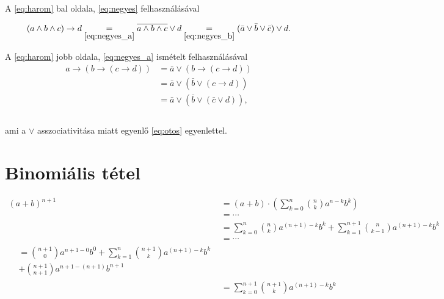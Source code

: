 \documentclass{article}
\begin{document}
A \eqref{eq:harom} bal oldala, \eqref{eq:negyes} felhasználásával

\begin{equation}
(a \wedge b \wedge c) \rightarrow d \underset{\eqref{eq:negyes_a}}{=} \overline{a \wedge b \wedge c} \vee d \underset{\eqref{eq:negyes_b}}{=} (\bar{a} \vee \bar{b} \vee \bar{c}) \vee d \text{.}
\label{eq:otos}
\end{equation}

A \eqref{eq:harom} jobb oldala, \eqref{eq:negyes_a} ismételt felhasználásával
\begin{align}
a \rightarrow ( b \rightarrow( c \rightarrow d)) &= \bar{a} \vee (b \rightarrow(c \rightarrow d)) \\ \nonumber
&= \bar{a} \vee ( \bar{b} \vee (c \rightarrow d)) \\ \nonumber
&= \bar{a} \vee ( \bar{b} \vee (\bar{c} \vee d)), \\ \nonumber \\ \nonumber
\label{eq:hatos}
\end{align}

ami a $\vee$ asszociativitása miatt egyenlő \eqref{eq:otos} egyenlettel.

\section{Binomiális tétel}

\begin{subequations}
\begin{align}
(a+b)^{n+1} &= (a+b) \cdot \left( \sum_{k=0}^n \binom{n}{k} a^{n-k}b^k \right) \\
&= \cdots \\ \nonumber
&= \sum_{k=0}^n \binom{n}{k} a^{(n+1)-k}b^k 
+ \sum_{k=1}^{n+1} \binom{n}{k-1} a^{(n+1)-k}b^{k} \\
&= \cdots \\ \nonumber
\begin{split}
&= \binom{n+1}{0} a^{n+1-0} b^0 + \sum_{k=1}^n \binom{n+1}{k} a^{(n+1)-k}b^k \\ &+ \binom{n+1}{n+1} a^{n+1-(n+1)} b^{n+1} 
\end{split} \\
&= \sum_{k=0}^{n+1} \binom{n+1}{k} a^{(n+1)-k}b^k 
\end{align}


\end{subequations}
\end{document}
